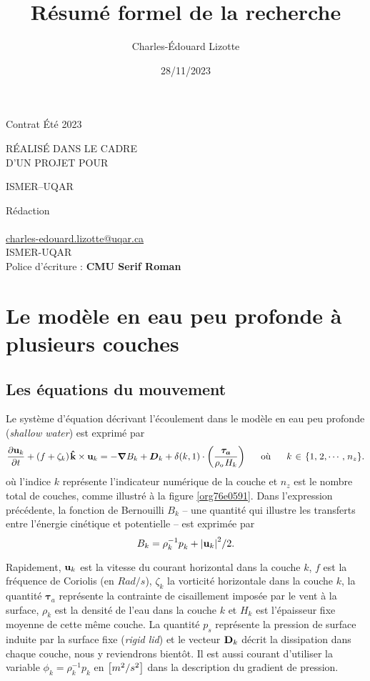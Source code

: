 \documentclass[10pt]{report}
\author{Charles-Édouard Lizotte}
\date{28/11/2023}
\title{Résumé formel de la recherche}
\makeatletter
\numberwithin{equation}{section}
\newcommand{\kvf}{\vb{\hat{k}}}
\newcommand{\uu}{\vb{u}}
\newcommand{\pt}{\hspace{1pt}} %
\newcommand{\mytitlepage}{
\begin{titlepage}
\begin{center}
{\Huge Contrat Été 2023 \par}
\vspace{2cm}
{\Huge \MakeUppercase{\thetitle} \par}
\vspace{2cm}
RÉALISÉ DANS LE CADRE\\ D'UN PROJET POUR \par
\vspace{2cm}
{\Huge ISMER--UQAR \par}
\vspace{2cm}
{\thedate}
\end{center}
\vfill
Rédaction \\
{\theauthor}\\
\url{charles-edouard.lizotte@uqar.ca}\\
ISMER-UQAR\\
Police d'écriture : \textbf{CMU Serif Roman}
\end{titlepage}
}
\makeatother
\begin{document}
\mytitlepage
\tableofcontents\newpage


\chapter{Le modèle en eau peu profonde à plusieurs couches}
\label{sec:org53e7401}

\section{Les équations du mouvement}
\label{sec:orgd5774d4}

Le système d'équation décrivant l'écoulement dans le modèle en eau peu profonde (\emph{shallow water}) est exprimé par 
\begin{equation}
\label{eq:org46a3c13}
   \pdv{\uu_k}{t} + \qty(f+\zeta_k)\pt \kvf\times\uu_k = -\gradient{B_k} + \boldsymbol{D}_k + \delta(k,1)\cdot \qty(\frac{\boldsymbol{\tau_a}}{\rho_o\pt H_k})
   \hspace{0.6cm} \text{où} \hspace{0.6cm} k\pt \in\pt \lbrace 1,\pt2,\cdots ,\pt n_z\rbrace.
\end{equation}
où l'indice \(k\) représente l'indicateur numérique de la couche et \(n_z\) est le nombre total de couches, comme illustré à la figure \ref{org76e0591}.
Dans l'expression précédente, la fonction de Bernouilli \(B_k\) -- une quantité qui illustre les transferts entre l'énergie cinétique et potentielle -- est exprimée par
\begin{equation}
   B_k =  \rho_k^{-1} p_k^{} + \abs{\uu_k}^2/2.
\end{equation}

Rapidement, \(\uu_k\) est la vitesse du courant horizontal dans la couche \(k\), \(f\) est la fréquence de Coriolis (en \(Rad/s\)), \(\zeta_k\) la vorticité horizontale dans la couche \(k\), la quantité \(\boldsymbol{\tau}_a\) représente la contrainte de cisaillement imposée par le vent à la surface, \(\rho_k\) est la densité de l'eau dans la couche \(k\) et \(H_k\) est l'épaisseur fixe moyenne de cette même couche.
La quantité \(p_s\) représente la pression de surface induite par la surface fixe (\emph{rigid lid}) et le vecteur \(\vb{D}_k\) décrit la dissipation dans chaque couche, nous y reviendrons bientôt.
Il est aussi courant d'utiliser la variable \(\phi_k = \rho_k^{-1} p_k\) en \(\qty[m^2/s^2]\) dans la description du gradient de pression.\bigskip
\end{document}

